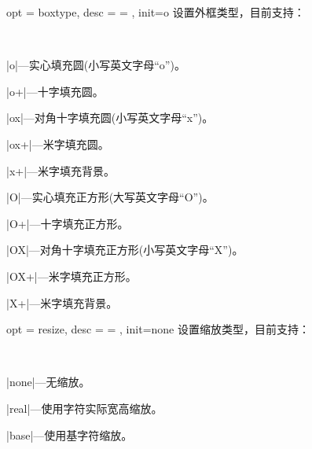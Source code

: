\documentclass[full]{l3doc}
\begin{document}
\begin{documentation}
\bigskip

\begin{option}{ opt = boxtype, desc = {= }, init=o }
  设置外框类型，目前支持：
\end{option}\\
  \begin{Description}
    \item |o|---实心填充圆(小写英文字母``o'')。
    \item |o+|---十字填充圆。
    \item |ox|---对角十字填充圆(小写英文字母``x'')。
    \item |ox+|---米字填充圆。
    \item |x+|---米字填充背景。
    \item |O|---实心填充正方形(大写英文字母``O'')。
    \item |O+|---十字填充正方形。
    \item |OX|---对角十字填充正方形(小写英文字母``X'')。
    \item |OX+|---米字填充正方形。
    \item |X+|---米字填充背景。
  \end{Description}
\begin{SideBySideExample}[frame=single,numbers=left,xrightmargin=.50\linewidth,gobble=2]
  \centering
  \quad
  \quad
  \quad
  \quad
\end{SideBySideExample}

\begin{SideBySideExample}[frame=single,numbers=left,xrightmargin=.50\linewidth,gobble=2]
  \centering
  \quad
  \quad
  \quad
  \quad
\end{SideBySideExample}

\bigskip

\begin{option}{ opt = resize, desc = {= }, init=none }
  设置缩放类型，目前支持：
\end{option}\\
\begin{Description}
  \item |none|---无缩放。
  \item |real|---使用字符实际宽高缩放。
  \item |base|---使用基字符缩放。
\end{Description}
\begin{SideBySideExample}[frame=single,numbers=left,xrightmargin=.45\linewidth,gobble=2]
  \centering
  \quad
  \quad
\end{SideBySideExample}


\end{documentation}
\end{document}

